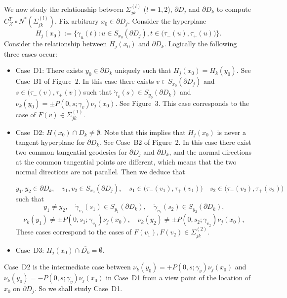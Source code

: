 \documentclass[a4paper,11pt,reqno]{amsart}
\numberwithin{equation}{section}
\theoremstyle{definition}
\theoremstyle{remark}
\begin{document}
%
%
\par 
%
%
We now study the relationship between $\Sigma_{jk}^{(l)}$ ($l=1,2$), 
$\partial{D_j}$ and $\partial{D_k}$ 
to compute $C_\mathcal{X}^T{\circ}N^\ast(\Sigma_{jk}^{(l)})$. 
Fix arbitrary $x_0 \in \partial{D_j}$. Consider the hyperplane
%
%
$$
H_j(x_0)
:=
\bigl\{
\gamma_u(t)
: 
u \in S_{x_0}(\partial{D_j}), 
t\in\bigl(\tau_-(u),\tau_+(u)\bigr)
\bigr\}. 
$$
%
% 
Consider the relationship between $H_j(x_0)$ and $\partial{D_k}$. 
Logically the following three cases occur: 
%
%
\begin{itemize}
\item
Case~D1: 
There exists $y_0 \in \partial{D_k}$ uniquely such that $H_j(x_0)=H_k(y_0)$. 
See Case~B1 of Figure~2. 
In this case there exists $v \in S_{x_0}(\partial{D_j})$ and 
$s \in \bigl(\tau_-(v),\tau_+(v)\bigr)$ such that 
$\dot{\gamma}_v(s) \in S_{y_0}(\partial{D_k})$ and $\nu_k(y_0)={\pm}P(0,s;\gamma_v)\nu_j(x_0)$. 
See Figure~3. 
This case corresponds to the case of $F(v) \in \Sigma_{jk}^{(1)}$. 
\vspace{6pt}
\item 
Case~D2: 
$H(x_0){\cap}D_k\ne\emptyset$. 
Note that this implies that $H_j(x_0)$ is never a tangent hyperplane 
for $\partial{D_k}$. See Case~B2 of Figure~2. 
In this case there exist two common tangential geodesics for $\partial{D_j}$ and $\partial{D_k}$, 
and the normal directions at the common tangential points are different, 
which means that the two normal directions are not parallel. 
Then we deduce that 

%
%
$$
y_1, y_2 \in \partial{D_k},
\quad 
v_1, v_2 \in S_{x_0}(\partial{D_j}),
\quad 
s_1 \in \bigl(\tau_-(v_1),\tau_+(v_1)\bigr)
\quad
s_2 \in \bigl(\tau_-(v_2),\tau_+(v_2)\bigr)
$$
%
% 
such that 
%
%
$$
y_1{\ne}y_2,
\quad 
\dot{\gamma}_{v_1}(s_1) \in S_{y_1}(\partial{D_k}),
\quad
\dot{\gamma}_{v_2}(s_2) \in S_{y_2}(\partial{D_k}),
$$
%
%
$$
\nu_k(y_1)\ne{\pm}P(0,s_1;\gamma_{v_1})\nu_j(x_0),
\quad
\nu_k(y_2)\ne{\pm}P(0,s_2;\gamma_{v_2})\nu_j(x_0),
$$
%
%
These cases correspond to the cases of 
$F(v_1), F(v_2) \in \Sigma_{jk}^{(2)}$. 
\vspace{6pt}
\item 
Case~D3: 
$H_j(x_0){\cap}\overline{D_k}=\emptyset$. 
\end{itemize}
%
%
Case~D2 is the intermediate case between 
$\nu_k(y_0)=+P(0,s;\gamma_v)\nu_j(x_0)$ and 
$\nu_k(y_0)=-P(0,s;\gamma_v)\nu_j(x_0)$ in Case~D1 
from a view point of the location of $x_0$ on $\partial{D_j}$. 
So we shall study Case~D1. 
%
%
\par
\end{document}
